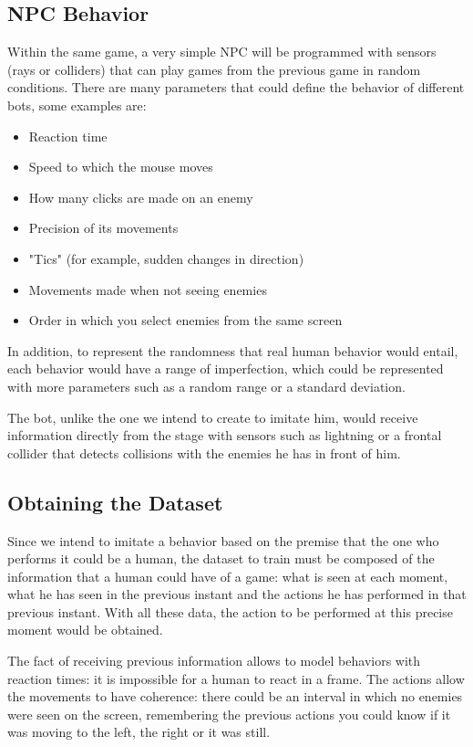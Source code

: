 \subsection{NPC Behavior}

Within the same game, a very simple NPC will be programmed with sensors (rays or colliders) that can play games from the previous game in random conditions. There are many parameters that could define the behavior of different bots, some examples are:
\begin{itemize}
 \item Reaction time
 \item Speed to which the mouse moves
 \item How many clicks are made on an enemy
 \item Precision of its movements
 \item "Tics" (for example, sudden changes in direction)
 \item Movements made when not seeing enemies
 \item Order in which you select enemies from the same screen
\end{itemize}

In addition, to represent the randomness that real human behavior would entail, each behavior would have a range of imperfection, which could be represented with more parameters such as a random range or a standard deviation.

The bot, unlike the one we intend to create to imitate him, would receive information directly from the stage with sensors such as lightning or a frontal collider that detects collisions with the enemies he has in front of him.

\subsection{Obtaining the Dataset}

Since we intend to imitate a behavior based on the premise that the one who performs it could be a human, the dataset to train must be composed of the information that a human could have of a game: what is seen at each moment, what he has seen in the previous instant and the actions he has performed in that previous instant. With all these data, the action to be performed at this precise moment would be obtained.

The fact of receiving previous information allows to model behaviors with reaction times: it is impossible for a human to react in a frame. The actions allow the movements to have coherence: there could be an interval in which no enemies were seen on the screen, remembering the previous actions you could know if it was moving to the left, the right or it was still.

